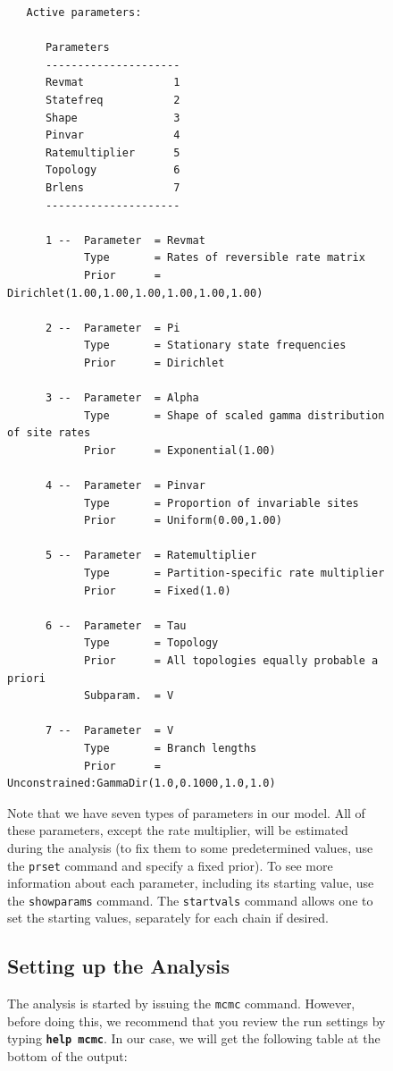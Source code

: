 \documentclass[12pt]{book}
\newcommand{\ttt}[1]{\texttt{#1}}
\newcommand{\tb}[1]{\ttt{\textbf{#1}}}
\begin{document}
\begin{figure}[h]
\begin{singlespacing}
\begin{verbatim}
   Active parameters: 

      Parameters
      ---------------------
      Revmat              1
      Statefreq           2
      Shape               3
      Pinvar              4
      Ratemultiplier      5
      Topology            6
      Brlens              7
      ---------------------

      1 --  Parameter  = Revmat
            Type       = Rates of reversible rate matrix
            Prior      = Dirichlet(1.00,1.00,1.00,1.00,1.00,1.00)

      2 --  Parameter  = Pi
            Type       = Stationary state frequencies
            Prior      = Dirichlet

      3 --  Parameter  = Alpha
            Type       = Shape of scaled gamma distribution of site rates
            Prior      = Exponential(1.00)

      4 --  Parameter  = Pinvar
            Type       = Proportion of invariable sites
            Prior      = Uniform(0.00,1.00)

      5 --  Parameter  = Ratemultiplier
            Type       = Partition-specific rate multiplier
            Prior      = Fixed(1.0)

      6 --  Parameter  = Tau
            Type       = Topology
            Prior      = All topologies equally probable a priori
            Subparam.  = V

      7 --  Parameter  = V
            Type       = Branch lengths
            Prior      = Unconstrained:GammaDir(1.0,0.1000,1.0,1.0)

\end{verbatim}
\normalsize
\end{singlespacing}

Note that we have seven types of parameters in our model. All of these parameters, except the rate
multiplier, will be estimated during the analysis (to fix them to some predetermined values, use
the \ttt{prset} command and specify a fixed prior). To see more information about each parameter,
including its starting value, use the \ttt{showparams} command. The \ttt{startvals} command allows
one to set the starting values, separately for each chain if desired.

\subsection{Setting up the Analysis}

The analysis is started by issuing the \ttt{mcmc} command. However, before doing this, we recommend
that you review the run settings by typing \tb{help mcmc}. In our case, we will get the following
table at the bottom of the output:


\end{figure}
\end{document}

